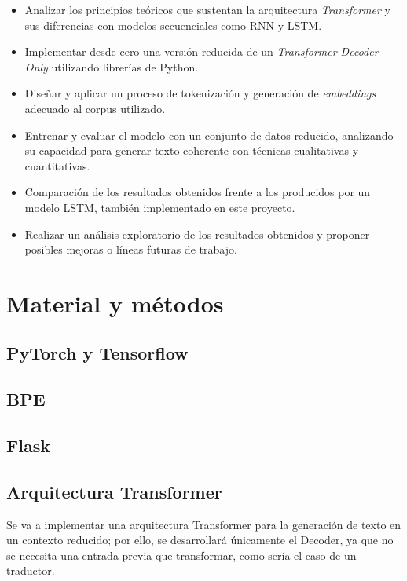\documentclass[11pt]{book}
\newcommand{\clearemptydoublepage}{\newpage{\pagestyle{empty}\cleardoublepage}}
\begin{document}
\begin{itemize}
    \item Analizar los principios teóricos que sustentan la arquitectura \textit{Transformer} y sus diferencias con modelos secuenciales como RNN y LSTM.
    \item Implementar desde cero una versión reducida de un \textit{Transformer Decoder Only} utilizando librerías de Python.
    \item Diseñar y aplicar un proceso de tokenización y generación de \textit{embeddings} adecuado al corpus utilizado.
    \item Entrenar y evaluar el modelo con un conjunto de datos reducido, analizando su capacidad para generar texto coherente con técnicas cualitativas y cuantitativas.
    \item Comparación de los resultados obtenidos frente a los producidos por un modelo LSTM, también implementado en este proyecto.
    \item Realizar un análisis exploratorio de los resultados obtenidos y proponer posibles mejoras o líneas futuras de trabajo.
\end{itemize}



\clearemptydoublepage

\chapter{Material y métodos}
\section{PyTorch y Tensorflow}
\section{BPE}
\section{Flask}


\section{Arquitectura Transformer} \label{Arquitectura Transformer}

Se va a implementar una arquitectura Transformer para la generación de texto en un contexto reducido; por ello, se desarrollará únicamente el Decoder, ya que no se necesita una entrada previa que transformar, como sería el caso de un traductor.
\end{document}
